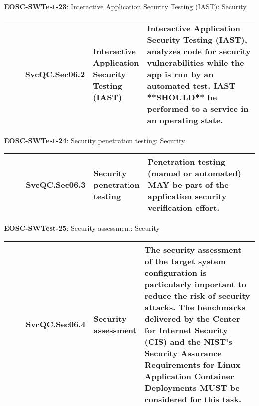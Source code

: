 \textbf{EOSC-SWTest-23}: Interactive Application Security Testing (IAST): Security
\nopagebreak[4]
\begin{center}
    \tabletail{\hline}
    \tiny
    \begin{supertabular}{|p{0.10\linewidth}|p{0.10\linewidth}|p{0.20\linewidth}|p{0.60\linewidth}|} \hline
        \cite{orviz_fernandez_eosc-synergy_2020} & SvcQC.Sec06.2 & Interactive Application Security Testing (IAST) & Interactive Application Security Testing (IAST), analyzes code for security vulnerabilities while the app is run by an automated test. IAST **SHOULD** be performed to a service in an operating state.\\ \hline
    \end{supertabular}
\end{center}

\textbf{EOSC-SWTest-24}: Security penetration testing: Security
\nopagebreak[4]
\begin{center}
    \tabletail{\hline}
    \tiny
    \begin{supertabular}{|p{0.10\linewidth}|p{0.10\linewidth}|p{0.20\linewidth}|p{0.60\linewidth}|} \hline
        \cite{orviz_fernandez_eosc-synergy_2020} & SvcQC.Sec06.3 & Security penetration testing & Penetration testing (manual or automated) MAY be part of the application security verification effort.\\ \hline
    \end{supertabular}
\end{center}

\textbf{EOSC-SWTest-25}: Security assessment: Security
\nopagebreak[4]
\begin{center}
    \tabletail{\hline}
    \tiny
    \begin{supertabular}{|p{0.10\linewidth}|p{0.10\linewidth}|p{0.20\linewidth}|p{0.60\linewidth}|} \hline
        \cite{orviz_fernandez_eosc-synergy_2020} & SvcQC.Sec06.4 & Security assessment & The security assessment of the target system configuration is particularly important to reduce the risk of security attacks. The benchmarks delivered by the Center for Internet Security (CIS) and the NIST's Security Assurance Requirements for Linux Application Container Deployments MUST be considered for this task.\\ \hline
    \end{supertabular}
\end{center}

